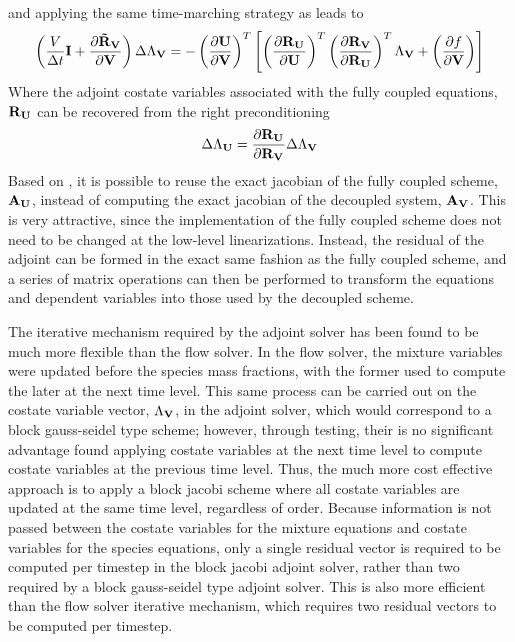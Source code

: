 and applying the same time-marching strategy as  leads to
\begin{equation}
  \left(
    \frac{V}{\Delta t} \mathbf I + \frac{\partial \mathbf{\tilde{R}_{\mathbf V}}}{\partial \mathbf V}
  \right) \Delta \Lambda_{\mathbf V}
  = -
  \left( \frac{\partial \mathbf U}{\partial \mathbf V} \right)^{T}
  \left[
    \left(\frac{\partial \mathbf R_{{\mathbf U}_{}}}{\partial \mathbf U} \right)^{T} 
    \left( \frac{\partial \mathbf R_{{\mathbf V}_{}}}{\partial \mathbf R_{{\mathbf U}_{}}} \right)^{T}
    \Lambda_{\mathbf V} 
    + \left( \frac{\partial f}{\partial \mathbf V} \right)
  \right]
  \label{adj-u-to-v-time}
\end{equation}
Where the adjoint costate variables associated with the fully coupled equations,
$\mathbf R_{{\mathbf U}_{}}$ can be recovered from the right preconditioning
\begin{equation}
  \Delta \Lambda_{\mathbf U} = \frac{\partial \mathbf R_{{\mathbf U}_{}}}{\partial \mathbf R_{{\mathbf V}_{}}} \Delta \Lambda_{\mathbf V}
  \label{adj-lam-v-to-u}
\end{equation}
Based on , it is possible to reuse the
exact jacobian of the fully coupled scheme, $\mathbf A_{\mathbf U}$, instead of computing
the exact jacobian of the decoupled system, $\mathbf A_{\mathbf V}$.  This is very
attractive, since the implementation of the fully coupled scheme does not need
to be changed at the low-level linearizations.  Instead, the residual of the
adjoint can be formed in the exact same fashion as the fully coupled scheme, and
a series of matrix operations can then be performed to transform the equations
and dependent variables into those used by the decoupled scheme.

The iterative mechanism required by the adjoint solver has been found to be much
more flexible than the flow solver.  In the flow solver, the mixture variables
were updated before the species mass fractions, with the former used to compute
the later at the next time level.  This same process can be carried out on the
costate variable vector, $\Lambda_{\mathbf V}$, in the adjoint solver, which would
correspond to a block gauss-seidel type scheme; however, through testing, their
is no significant advantage found applying costate variables at the next time
level to compute costate variables at the previous time level.  Thus, the much
more cost effective approach is to apply a block jacobi scheme where all
costate variables are updated at the same time level, regardless of order.
Because information is not passed between the costate variables for the mixture
equations and costate variables for the species equations, only a single
residual vector is required to be computed per timestep in the block jacobi
adjoint solver, rather than two required by a block gauss-seidel type adjoint
solver.  This is also more efficient than the flow solver iterative mechanism,
which requires two residual vectors to be computed per timestep.



